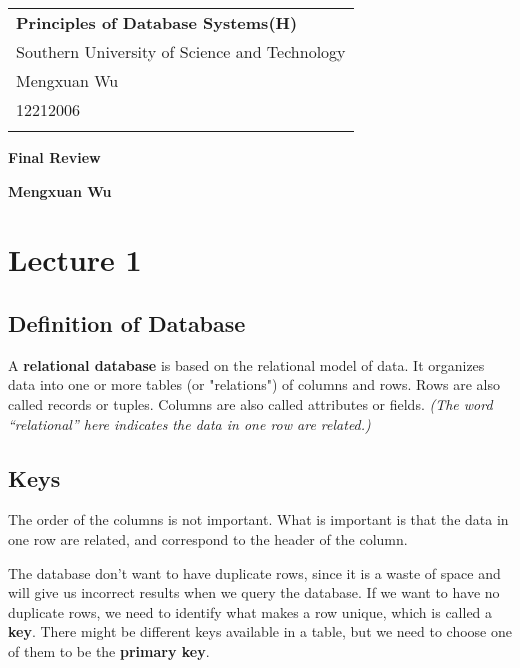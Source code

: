 \documentclass[a4paper,12pt]{article}
\begin{document}
\thispagestyle{empty} %

\begin{tabular}{p{15.5cm}}
{\large \bf Principles of Database Systems(H)} \\
Southern University of Science and Technology \\ Mengxuan Wu \\ 12212006 \\
\hline
\\
\end{tabular}

\vspace*{0.3cm} %

\begin{center}
	{\Large \bf Final Review}
	\vspace{2mm}

	{\bf Mengxuan Wu}
		
\end{center}  

\vspace{0.4cm}

\section{Lecture 1}

\subsection{Definition of Database}

A \textbf{relational database} is based on the relational model of data.
It organizes data into one or more tables (or "relations") of columns and rows.
Rows are also called records or tuples.
Columns are also called attributes or fields.
\textit{(The word ``relational'' here indicates the data in one row are related.)}

\subsection{Keys}

The order of the columns is not important.
What is important is that the data in one row are related, and correspond to the header of the column.

The database don't want to have duplicate rows, since it is a waste of space and will give us incorrect results when we query the database.
If we want to have no duplicate rows, we need to identify what makes a row unique, which is called a \textbf{key}.
There might be different keys available in a table, but we need to choose one of them to be the \textbf{primary key}.
\end{document}

